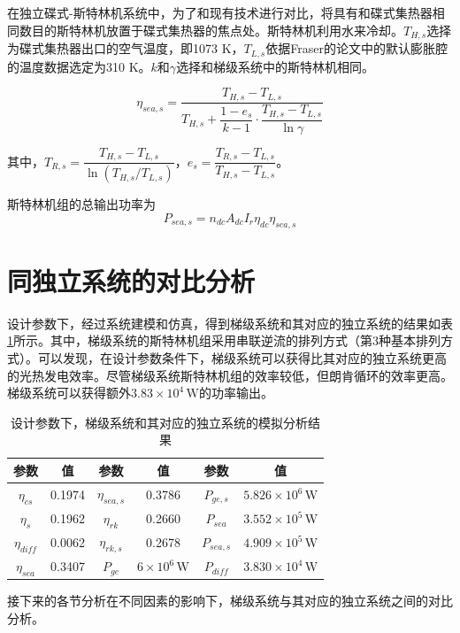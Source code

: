 在独立碟式-斯特林机系统中，为了和现有技术进行对比，将具有和碟式集热器相同数目的斯特林机放置于碟式集热器的焦点处。斯特林机利用水来冷却。$T_{H,s}$选择为碟式集热器出口的空气温度，即1073 K，$T_{L,s}$依据Fraser的论文\cite{Fraser2008}中的默认膨胀腔的温度数据选定为310 K。$k$和$\gamma$选择和梯级系统中的斯特林机相同。

\begin{equation}
	\eta_{sea,s}=\dfrac{T_{H,s}-T_{L,s}}{T_{H,s}+\dfrac{1-e_{s}}{k-1}\cdot\dfrac{T_{H,s}-T_{L,s}}{\ln\gamma}}
\end{equation}

其中，$T_{R,s}=\dfrac{T_{H,s}-T_{L,s}}{\ln(T_{H,s}/T_{L,s})}$，$e_{s}=\dfrac{T_{R,s}-T_{L,s}}{T_{H,s}-T_{L,s}}$。

斯特林机组的总输出功率为
\begin{equation}
	P_{sea,s}=n_{dc}A_{dc}I_r\eta_{dc}\eta_{sea,s}
\end{equation}

\section{同独立系统的对比分析}

设计参数下，经过系统建模和仿真，得到梯级系统和其对应的独立系统的结果如表\ref{tab:importantResults}所示。其中，梯级系统的斯特林机组采用串联逆流的排列方式（第3种基本排列方式）。可以发现，在设计参数条件下，梯级系统可以获得比其对应的独立系统更高的光热发电效率。尽管梯级系统斯特林机组的效率较低，但朗肯循环的效率更高。梯级系统可以获得额外$3.83\times10^4\,\mathrm{W}$的功率输出。

\begin{table}[htbp]
	\caption{设计参数下，梯级系统和其对应的独立系统的模拟分析结果}
	\begin{center}
	\begin{tabular}{cccccc}
		\toprule
		参数		&	值	&	参数		&	值	&	参数		&	值\\
		\midrule
		$\eta_{cs}$		&	0.1974	&	$\eta_{sea,s}$	&	0.3786	&	$P_{ge,s}$	&	$5.826\times10^6\,\mathrm{W}$\\
		$\eta_{s}$	&	0.1962	&	$\eta_{rk}$	&	0.2660	&	$P_{sea}$		&	$3.552\times10^5\,\mathrm{W}$\\
		$\eta_{diff}$		&	0.0062	&	$\eta_{rk,s}$	&	0.2678	&	$P_{sea,s}$	&	$4.909\times10^5\,\mathrm{W}$\\
		$\eta_{sea}$	&	0.3407	&	$P_{ge}$		&	$6\times10^6\,\mathrm{W}$	&	$P_{diff}$		&	$3.830\times10^4\,\mathrm{W}$\\
		\bottomrule
	\end{tabular}
	\end{center}
	\label{tab:importantResults}
\end{table}
接下来的各节分析在不同因素的影响下，梯级系统与其对应的独立系统之间的对比分析。
